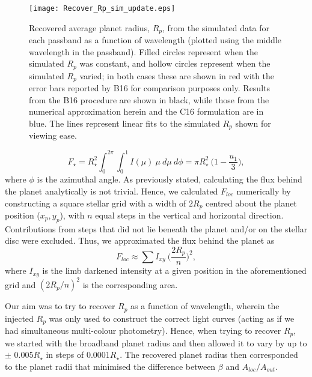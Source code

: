 \documentclass{aa}
\begin{document}
\begin{center}
\begin{figure}[t!]
\centering
\texttt{[image: Recover\_Rp\_sim\_update.eps]}
\caption[]{Recovered average planet radius, $R_p$, from the simulated data for each passband as a function of wavelength (plotted using the middle wavelength in the passband). Filled circles represent when the simulated $R_p$ was constant, and hollow circles represent when the simulated $R_p$ varied; in both cases these are shown in red with the error bars reported by B16 for comparison purposes only. Results from the B16 procedure are shown in black, while those from the numerical approximation herein and the C16 formulation are in blue. The lines represent linear fits to the simulated $R_p$ shown for viewing ease. 
\vspace{-5pt}
} 
\label{fig:Rp_wl}
\end{figure}
\end{center}

\vspace{-35pt}
\begin{equation}
\label{eqn:Idisc_full}
F_\star = R_\star^2 \int_0^{2\pi} \int_0^1 I(\mu) \ \mu \ d\mu \ d\phi = \pi R_\star^2 \ \Bigg(1 - \frac{u_1}{3}\Bigg),
\end{equation}
where $\phi$ is the azimuthal angle. As previously stated, calculating the flux behind the planet analytically is not trivial. Hence, we calculated $F_{loc}$ numerically by constructing a square stellar grid with a width of $2R_p$ centred about the planet position ($x_p, y_p$), with $n$ equal steps in the vertical and horizontal direction. Contributions from steps that did not lie beneath the planet and/or on the stellar disc were excluded. Thus, we approximated the flux behind the planet as
\begin{equation}
\label{eqn:Fp}
F_{loc} \approx \sum I_{xy} \ \Bigg( \frac{2R_p}{n} \Bigg)^2,
\end{equation}
where $I_{xy}$ is the limb darkened intensity at a given position in the aforementioned grid and $(2R_p/n)^2$ is the corresponding area.

Our aim was to try to recover $R_p$ as a function of wavelength, wherein the injected $R_p$ was only used to construct the correct light curves (acting as if we had simultaneous multi-colour photometry). Hence, when trying to recover $R_p$, we started with the broadband planet radius and then allowed it to vary by up to $\pm$ $0.005R_\star$ in steps of 0.0001$R_\star$. The recovered planet radius then corresponded to the planet radii that minimised the difference between $\beta$ and $A_{loc}/A_{out}$. 
\end{document}
